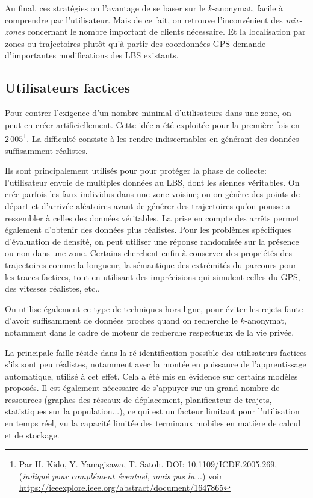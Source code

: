 \documentclass[a4paper,11pt]{article} %
\begin{document}
Au final, ces stratégies on l'avantage de se baser sur le $k$-anonymat, facile à comprendre par l'utilisateur. Mais de ce fait, on retrouve l'inconvénient des \emph{mix-zones} concernant le nombre important de clients nécessaire. Et la localisation par zones ou trajectoires plutôt qu'à partir des coordonnées GPS demande d'importantes modifications des LBS existants.
%
\subsection{Utilisateurs factices}
%
Pour contrer l'exigence d'un nombre minimal d'utilisateurs dans une zone, on peut en créer artificiellement. Cette idée a été exploitée pour la première fois en $2\,005$\footnote{Par H. Kido, Y. Yanagisawa, T. Satoh.  DOI: 10.1109/ICDE.2005.269, (\emph{indiqué pour complément éventuel, mais pas lu...}) voir \url{https://ieeexplore.ieee.org/abstract/document/1647865} }.
La difficulté consiste à les rendre indiscernables en générant des données suffisamment réalistes.

Ils sont principalement utilisés pour pour protéger la phase de collecte: l'utilisateur envoie de multiples données au LBS, dont les siennes véritables. 
On crée parfois les faux individus dans une zone voisine; ou on génère des points de départ et d'arrivée aléatoires avant de générer des trajectoires qu'on pousse a ressembler à celles des données véritables. 
La prise en compte des arrêts permet également d'obtenir des données plus réalistes.
Pour les problèmes spécifiques d'évaluation de densité, on peut utiliser une réponse randomisée sur la présence ou non dans une zone. 
Certains cherchent enfin à conserver des propriétés des trajectoires comme la longueur, la sémantique des extrémités du parcours pour les traces factices, tout en utilisant des \og imprécisions\fg{} qui simulent celles du GPS, des vitesses réalistes, etc..

On utilise également ce type de techniques hors ligne, pour éviter les rejets faute d'avoir suffisamment de données \og proches\fg{} quand on recherche le $k$-anonymat, notamment dans le cadre de moteur de recherche respectueux de la vie privée. 

La principale faille réside dans la ré-identification possible des utilisateurs factices s'ils sont peu réalistes, notamment avec la montée en puissance de l'apprentissage automatique, utilisé à cet effet. Cela a été mis en évidence sur certains modèles proposés. Il est également nécessaire de s'appuyer sur un grand nombre de ressources (graphes des réseaux de déplacement, planificateur de trajets, statistiques sur la population...), ce qui est un facteur limitant pour l'utilisation en temps réel, vu la capacité limitée des terminaux mobiles en matière de calcul et de stockage.
%
\end{document}
